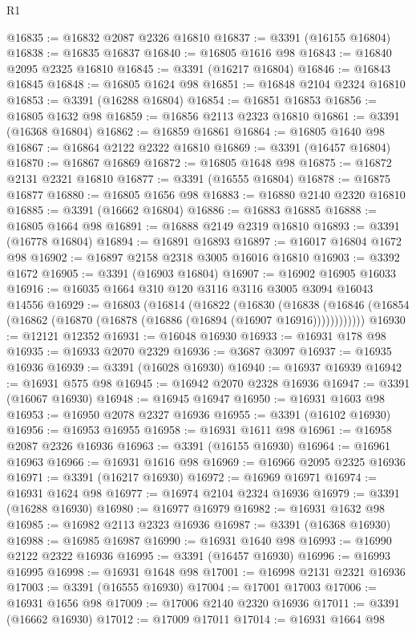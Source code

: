 \begin{lexlean}{R1}
\begin{coremodule}
@16835 := @16832 @2087 @2326 @16810
@16837 := @3391 (@16155 @16804)
@16838 := @16835 @16837
@16840 := @16805 @1616 @98
@16843 := @16840 @2095 @2325 @16810
@16845 := @3391 (@16217 @16804)
@16846 := @16843 @16845
@16848 := @16805 @1624 @98
@16851 := @16848 @2104 @2324 @16810
@16853 := @3391 (@16288 @16804)
@16854 := @16851 @16853
@16856 := @16805 @1632 @98
@16859 := @16856 @2113 @2323 @16810
@16861 := @3391 (@16368 @16804)
@16862 := @16859 @16861
@16864 := @16805 @1640 @98
@16867 := @16864 @2122 @2322 @16810
@16869 := @3391 (@16457 @16804)
@16870 := @16867 @16869
@16872 := @16805 @1648 @98
@16875 := @16872 @2131 @2321 @16810
@16877 := @3391 (@16555 @16804)
@16878 := @16875 @16877
@16880 := @16805 @1656 @98
@16883 := @16880 @2140 @2320 @16810
@16885 := @3391 (@16662 @16804)
@16886 := @16883 @16885
@16888 := @16805 @1664 @98
@16891 := @16888 @2149 @2319 @16810
@16893 := @3391 (@16778 @16804)
@16894 := @16891 @16893
@16897 := @16017 @16804 @1672 @98
@16902 := @16897 @2158 @2318 @3005 @16016 @16810
@16903 := @3392 @1672
@16905 := @3391 (@16903 @16804)
@16907 := @16902 @16905 @16033
@16916 := @16035 @1664 @310 @120 @3116 @3116 @3005 @3094 @16043 @14556
@16929 := @16803
    (@16814
      (@16822
        (@16830
          (@16838 (@16846 (@16854 (@16862 (@16870 (@16878 (@16886 (@16894 (@16907 @16916))))))))))))
@16930 := @12121 @12352
@16931 := @16048 @16930
@16933 := @16931 @178 @98
@16935 := @16933 @2070 @2329
@16936 := @3687 @3097
@16937 := @16935 @16936
@16939 := @3391 (@16028 @16930)
@16940 := @16937 @16939
@16942 := @16931 @575 @98
@16945 := @16942 @2070 @2328 @16936
@16947 := @3391 (@16067 @16930)
@16948 := @16945 @16947
@16950 := @16931 @1603 @98
@16953 := @16950 @2078 @2327 @16936
@16955 := @3391 (@16102 @16930)
@16956 := @16953 @16955
@16958 := @16931 @1611 @98
@16961 := @16958 @2087 @2326 @16936
@16963 := @3391 (@16155 @16930)
@16964 := @16961 @16963
@16966 := @16931 @1616 @98
@16969 := @16966 @2095 @2325 @16936
@16971 := @3391 (@16217 @16930)
@16972 := @16969 @16971
@16974 := @16931 @1624 @98
@16977 := @16974 @2104 @2324 @16936
@16979 := @3391 (@16288 @16930)
@16980 := @16977 @16979
@16982 := @16931 @1632 @98
@16985 := @16982 @2113 @2323 @16936
@16987 := @3391 (@16368 @16930)
@16988 := @16985 @16987
@16990 := @16931 @1640 @98
@16993 := @16990 @2122 @2322 @16936
@16995 := @3391 (@16457 @16930)
@16996 := @16993 @16995
@16998 := @16931 @1648 @98
@17001 := @16998 @2131 @2321 @16936
@17003 := @3391 (@16555 @16930)
@17004 := @17001 @17003
@17006 := @16931 @1656 @98
@17009 := @17006 @2140 @2320 @16936
@17011 := @3391 (@16662 @16930)
@17012 := @17009 @17011
@17014 := @16931 @1664 @98

\end{coremodule}
\end{lexlean}
